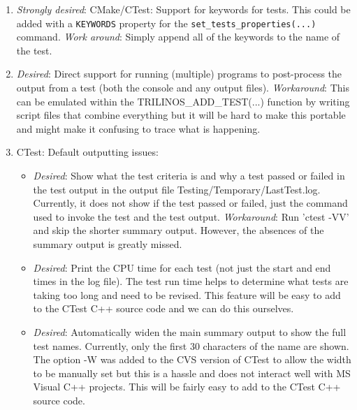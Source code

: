 \documentclass[pdf,ps2pdf,11pt]{SANDreport}
\begin{document}
\begin{enumerate}

{}\item\textit{Strongly desired}: CMake/CTest: Support for keywords
for tests.  This could be added with a {}\texttt{KEYWORDS} property
for the {}\texttt{set\_tests\_properties(...)} command.
{}\textit{Work around}: Simply append all of the keywords to the name
of the test.

{}\item\textit{Desired}: Direct support for running (multiple)
programs to post-process the output from a test (both the console and
any output files).  {}\textit{Workaround}: This can be emulated
within the TRILINOS\_ADD\_TEST(...) function by writing script files
that combine everything but it will be hard to make this portable and
might make it confusing to trace what is happening.

{}\item CTest: Default outputting issues:

  \begin{itemize}

  {}\item\textit{Desired}: Show what the test criteria is and why a
  test passed or failed in the test output in the output file
  Testing/Temporary/LastTest.log.  Currently, it does not show if the
  test passed or failed, just the command used to invoke the test and
  the test output.  {}\textit{Workaround}: Run 'ctest -VV' and skip
  the shorter summary output.  However, the absences of the summary
  output is greatly missed.
  
  {}\item\textit{Desired}: Print the CPU time for each test (not just
  the start and end times in the log file).  The test run time helps
  to determine what tests are taking too long and need to be revised.
  This feature will be easy to add to the CTest C++ source code and we
  can do this ourselves.

  {}\item\textit{Desired}: Automatically widen the main summary output
  to show the full test names.  Currently, only the first 30
  characters of the name are shown.  The option -W was added to the
  CVS version of CTest to allow the width to be manually set but this
  is a hassle and does not interact well with MS Visual C++ projects.
  This will be fairly easy to add to the CTest C++ source code.

  \end{itemize}


\end{enumerate}
\end{document}
